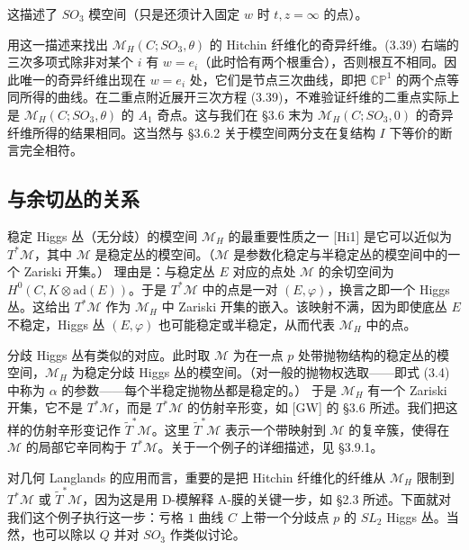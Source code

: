 \documentclass[11pt,a4paper]{article}
\begin{document}
这描述了 $SO_3$ 模空间（只是还须计入固定 $w$ 时 $t,z=\infty$ 的点）。

用这一描述来找出 $\mathcal{M}_H(C;SO_3,\theta)$ 的 Hitchin 纤维化的奇异纤维。(3.39) 右端的三次多项式除非对某个 $i$ 有 $w=e_i$（此时恰有两个根重合），否则根互不相同。因此唯一的奇异纤维出现在 $w=e_i$ 处，它们是节点三次曲线，即把 $\mathbb{C}\mathbb{P}^1$ 的两个点等同所得的曲线。在二重点附近展开三次方程 (3.39)，不难验证纤维的二重点实际上是 $\mathcal{M}_H(C;SO_3,\theta)$ 的 $A_1$ 奇点。这与我们在 §3.6 末为 $\mathcal{M}_H(C;SO_3,0)$ 的奇异纤维所得的结果相同。这当然与 §3.6.2 关于模空间两分支在复结构 $I$ 下等价的断言完全相符。

\subsection{与余切丛的关系}

稳定 Higgs 丛（无分歧）的模空间 $\mathcal{M}_H$ 的最重要性质之一 [Hi1] 是它可以近似为 $T^*\mathcal{M}$，其中 $\mathcal{M}$ 是稳定丛的模空间。（$\mathcal{M}$ 是参数化稳定与半稳定丛的模空间中的一个 Zariski 开集。）
理由是：与稳定丛 $E$ 对应的点处 $\mathcal{M}$ 的余切空间为 $H^0(C,K\otimes\mathrm{ad}(E))$。于是 $T^*\mathcal{M}$ 中的点是一对 $(E,\varphi)$，换言之即一个 Higgs 丛。这给出 $T^*\mathcal{M}$ 作为 $\mathcal{M}_H$ 中 Zariski 开集的嵌入。该映射不满，因为即使底丛 $E$ 不稳定，Higgs 丛 $(E,\varphi)$ 也可能稳定或半稳定，从而代表 $\mathcal{M}_H$ 中的点。

分歧 Higgs 丛有类似的对应。此时取 $\mathcal{M}$ 为在一点 $p$ 处带抛物结构的稳定丛的模空间，$\mathcal{M}_H$ 为稳定分歧 Higgs 丛的模空间。（对一般的抛物权选取——即式 (3.4) 中称为 $\alpha$ 的参数——每个半稳定抛物丛都是稳定的。）
于是 $\mathcal{M}_H$ 有一个 Zariski 开集，它不是 $T^*\mathcal{M}$，而是 $T^*\mathcal{M}$ 的仿射辛形变，如 [GW] 的 §3.6 所述。我们把这样的仿射辛形变记作 $\tilde{T}^*\mathcal{M}$。这里 $\tilde{T}^*\mathcal{M}$ 表示一个带映射到 $\mathcal{M}$ 的复辛簇，使得在 $\mathcal{M}$ 的局部它辛同构于 $T^*\mathcal{M}$。关于一个例子的详细描述，见 §3.9.1。

对几何 Langlands 的应用而言，重要的是把 Hitchin 纤维化的纤维从 $\mathcal{M}_H$ 限制到 $T^*\mathcal{M}$ 或 $\tilde{T}^*\mathcal{M}$，因为这是用 D-模解释 A-膜的关键一步，如 §2.3 所述。下面就对我们这个例子执行这一步：亏格 $1$ 曲线 $C$ 上带一个分歧点 $p$ 的 $SL_2$ Higgs 丛。当然，也可以除以 $Q$ 并对 $SO_3$ 作类似讨论。
\end{document}
